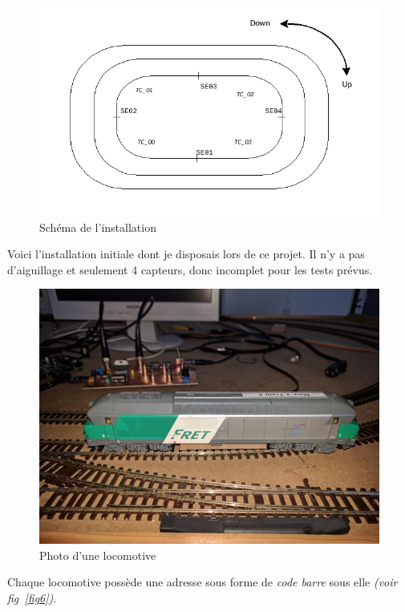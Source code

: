 \begin{figure}[h]
\centering
\includegraphics[scale=0.55]{circuit_vrai.png}
\caption{Sch\'ema de l'installation}
\label{schéma réél}
\end{figure}

Voici l'installation initiale dont je disposais lors de ce projet. Il n'y a pas
d'aiguillage et seulement 4 capteurs, donc incomplet pour les tests prévus.


\begin{figure}[h]
\centering
\includegraphics[scale=0.27]{loco.jpg}
\caption{Photo d'une locomotive}
\label{fig5}
\end{figure}

\newpage

Chaque locomotive poss\`ede une adresse sous forme de \emph{code
barre} sous elle \emph{(voir fig~\ref{fig6})}.


